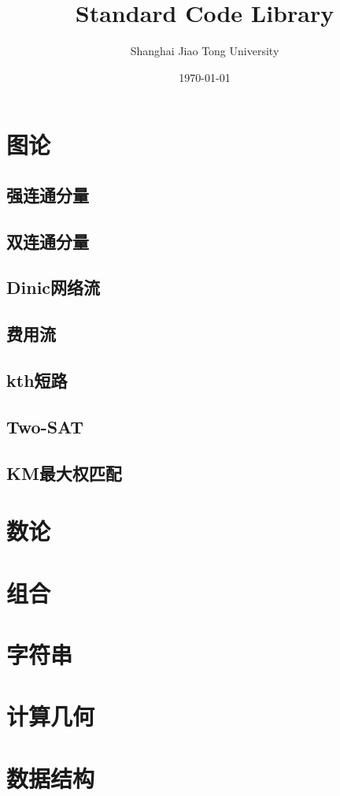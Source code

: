 \documentclass[a4paper,openany]{book}
\begin{document}
	
	\title{\textbf{\LARGE{Standard Code Library}}}
	\author{Shanghai Jiao Tong University}
	\date{\today}
	\maketitle
	\tableofcontents
	\begin{spacing}{0.9}

	\chapter{图论}
		\section{强连通分量}
		\section{双连通分量}
		\section{Dinic网络流}
		\section{费用流}
		\section{kth短路}
		\section{Two-SAT}
		\section{KM最大权匹配}
	\chapter{数论}
	\chapter{组合}
	\chapter{字符串}
	\chapter{计算几何}
	\chapter{数据结构}

\end{spacing}
\end{document}
